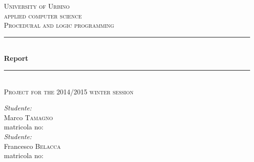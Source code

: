 \documentclass[11pt, a4paper, titlepage, block]{article}
\begin{document}
	\begin{titlepage}
		
		\newcommand{\HRule}{\rule{\linewidth}{0.5mm}} %
		
		\center %
		
		
		\textsc{\LARGE University of Urbino}\\[1.5cm] %
		\textsc{\Large applied computer science}\\[0.5cm] %
		\textsc{\large Procedural and logic programming}\\[0.5cm] %
		
		
		
		\HRule \\[0.4cm]
		{ \huge \bfseries Report}\\[0.2cm] %
		\HRule \\[0.4cm]
		\textsc{\large Project for the 2014/2015 winter session}
		\\[2cm]
		
		\begin{minipage}{\textwidth}
			\begin{flushleft}
				\emph{Studente:}\\
				Marco \textsc{Tamagno}\\ %
				matricola no: 
				\\[1cm]
				\emph{Studente:}\\
				Francesco \textsc{Belacca}\\ %
				matricola no:\\
			\end{flushleft}
		\end{minipage}\\[1cm]
		

\end{titlepage}
\end{document}
